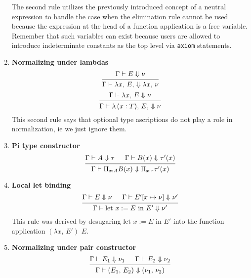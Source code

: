 \documentclass{article}
\begin{document}
\begin{enumerate}
  The second rule utilizes the previously introduced concept of a neutral
  expression to handle the case when the elimination rule cannot be used because
  the expression at the head of a function application is a free variable.
  Remember that such variables can exist because users are allowed to introduce
  indeterminate constants as the top level via \verb|axiom| statements.

\item \textbf{Normalizing under lambdas} \\
  \[
    \begin{prooftree}
      \hypo{\Gamma \vdash E \Downarrow \nu}
      \infer1{\Gamma \vdash \lambda x, \, E, \, \Downarrow \lambda x, \, \nu}
    \end{prooftree}
  \]
  \[
    \begin{prooftree}
      \hypo{\Gamma \vdash \lambda x, \, E \Downarrow \nu}
      \infer1{\Gamma \vdash \lambda \, (x : T), \, E, \, \Downarrow \nu}
    \end{prooftree}
  \]
  This second rule says that optional type ascriptions do not play a role in
  normalization, ie we just ignore them.

\item \textbf{Pi type constructor} \\
  \[
    \begin{prooftree}
      \hypo{\Gamma \vdash A \Downarrow \tau}
      \hypo{\Gamma \vdash B(x) \Downarrow \tau'(x)}
      \infer2{\Gamma \vdash \Pi_{x : A} B(x) \Downarrow \Pi_{x : \tau} \tau'(x)}
    \end{prooftree}
  \]

\item \textbf{Local let binding} \\
    \[
      \begin{prooftree}
        \hypo{\Gamma \vdash E \Downarrow \nu}
        \hypo{\Gamma \vdash E'[x \mapsto \nu] \Downarrow \nu'}
        \infer2{\Gamma \vdash \text{let } x := E \text{ in } E' \Downarrow \nu'}
      \end{prooftree}
    \]
    This rule was derived by desugaring $\text{let } x := E \text{ in } E'$ into
    the function application $(\lambda x, \, E') \,\, E$.

\item \textbf{Normalizing under pair constructor} \\
    \[
      \begin{prooftree}
        \hypo{\Gamma \vdash E_1 \Downarrow \nu_1}
        \hypo{\Gamma \vdash E_2 \Downarrow \nu_2}
        \infer2{\Gamma \vdash (E_1, \, E_2) \Downarrow (\nu_1, \, \nu_2)}
      \end{prooftree}
    \]


\end{enumerate}
\end{document}
